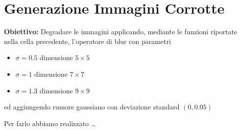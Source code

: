 \section{Generazione Immagini Corrotte}
\textbf{Obiettivo:}
Degradare le immagini applicando, mediante le funzioni riportate nella cella precedente,  l'operatore di blur con parametri
\begin{itemize}
    \item{$\sigma=0.5$ dimensione $5\times 5$}
    \item{$\sigma=1$ dimensione $7\times 7$}
    \item{$\sigma=1.3$ dimensione $9\times 9$}
\end{itemize}
ed aggiungendo rumore gaussiano con deviazione standard $(0,0.05)$

Per farlo abbiamo realizzato \dots

